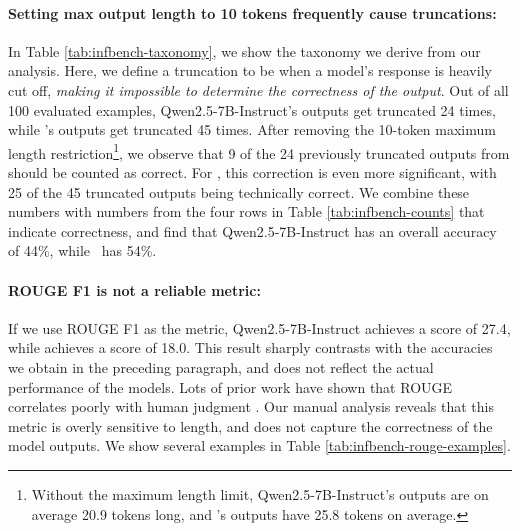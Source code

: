 \paragraph{Setting max output length to 10 tokens frequently cause truncations:} In Table \ref{tab:infbench-taxonomy}, we show the taxonomy we derive from our analysis. Here, we define a truncation to be when a model's response is heavily cut off, \textit{making it impossible to determine the correctness of the output}. Out of all 100 evaluated examples, Qwen2.5-7B-Instruct's outputs get truncated 24 times, while \qwenftbalanced's outputs get truncated 45 times. After removing the 10-token maximum length restriction\footnote{Without the maximum length limit, Qwen2.5-7B-Instruct's outputs are on average 20.9 tokens long, and \qwenftbalanced's outputs have 25.8 tokens on average.}, we observe that 9 of the 24 previously truncated outputs from \qweninst should be counted as correct. For \qwenftbalanced, this correction is even more significant, with 25 of the 45 truncated outputs being technically correct. We combine these numbers with numbers from the four rows in Table \ref{tab:infbench-counts} that indicate correctness, and find that Qwen2.5-7B-Instruct has an overall accuracy of 44\%, while \qwenftbalanced\ has 54\%.

\paragraph{ROUGE F1 is not a reliable metric:} If we use ROUGE F1 as the metric, Qwen2.5-7B-Instruct achieves a score of 27.4, while \qwenftbalanced achieves a score of 18.0. This result sharply contrasts with the accuracies we obtain in the preceding paragraph, and does not reflect the actual performance of the models. Lots of prior work have shown that ROUGE correlates poorly with human judgment \cite{goyal2023newssummarizationevaluationera, chang_booookscore_2024}. Our manual analysis reveals that this metric is overly sensitive to length, and does not capture the correctness of the model outputs. We show several examples in Table \ref{tab:infbench-rouge-examples}.